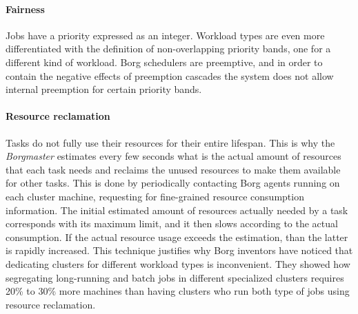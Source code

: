 \paragraph{Fairness}
Jobs have a priority expressed as an integer.
Workload types are even more differentiated with the definition of non-overlapping priority bands, one for a different kind of workload.
Borg \cite{borg} schedulers are preemptive, and in order to contain the negative effects of preemption cascades the system does not allow internal preemption for certain priority bands.
\paragraph{Resource reclamation}
Tasks do not fully use their resources for their entire lifespan.
This is why the \textit{Borgmaster} estimates every few seconds what is the actual amount of resources that each task needs and reclaims the unused resources to make them available for other tasks.
This is done by periodically contacting Borg \cite{borg} agents running on each cluster machine, requesting for fine-grained resource consumption information.
The initial estimated amount of resources actually needed by a task corresponds with its maximum limit, and it then slows according to the actual consumption.
If the actual resource usage exceeds the estimation, than the latter is rapidly increased.
This technique justifies why Borg \cite{borg} inventors have noticed that dedicating clusters for different workload types is inconvenient.
They showed how segregating long-running and batch jobs in different specialized clusters requires 20\% to 30\% more machines than having clusters who run both type of jobs using resource reclamation.

